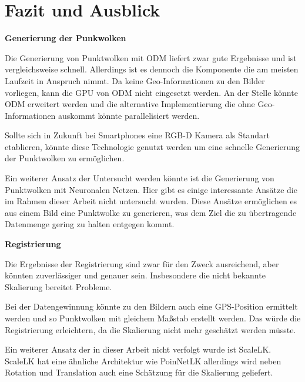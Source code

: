 \documentclass[12pt,titlepage, twoside]{article}
\begin{document}
\newpage
\section{Fazit und Ausblick}
\label{sec:fazit}
%

\textbf{Generierung der Punkwolken}

Die Generierung von Punktwolken mit ODM liefert zwar gute Ergebnisse und ist vergleichsweise schnell. Allerdings ist es dennoch die Komponente die am meisten Laufzeit in Anspruch nimmt.
Da keine Geo-Informationen zu den Bilder vorliegen, kann die GPU von ODM nicht eingesetzt werden. An der Stelle könnte ODM erweitert werden und die alternative Implementierung die ohne Geo-Informationen auskommt könnte parallelisiert werden.

Sollte sich in Zukunft bei Smartphones eine RGB-D Kamera als Standart etablieren, könnte diese Technologie genutzt werden um eine schnelle Generierung der Punktwolken zu ermöglichen.

Ein weiterer Ansatz der Untersucht werden könnte ist die Generierung von Punktwolken mit Neuronalen Netzen. Hier gibt es einige interessante Ansätze die im Rahmen dieser Arbeit nicht untersucht wurden. 
Diese Ansätze ermöglichen es aus einem Bild eine Punktwolke zu generieren, was dem Ziel die zu übertragende Datenmenge gering zu halten entgegen kommt.

\textbf{Registrierung}

Die Ergebnisse der Registrierung sind zwar für den Zweck ausreichend, aber könnten zuverlässiger und genauer sein. Insbesondere die nicht bekannte Skalierung bereitet Probleme.

Bei der Datengewinnung könnte zu den Bildern auch eine GPS-Position ermittelt werden und so Punktwolken mit gleichem Maßstab erstellt werden. Das würde die Registrierung erleichtern, da die Skalierung nicht mehr geschätzt werden müsste.

Ein weiterer Ansatz der in dieser Arbeit nicht verfolgt wurde ist ScaleLK. ScaleLK hat eine ähnliche Architektur wie PoinNetLK allerdings wird neben Rotation und Translation auch eine Schätzung für die Skalierung geliefert.
\end{document}
